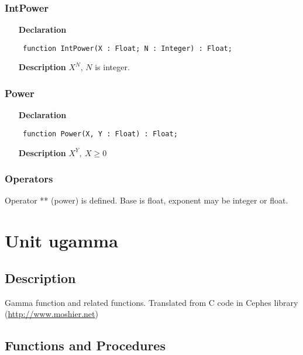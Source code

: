 \documentclass[12pt,a4paper,oneside]{report}
\newcommand{\lmath}[1]{   %
	\marginpar{\vspace{#1} 
		\begin{flushright}
			LMath
	\end{flushright} }
}
\newcommand{\declarationitem}[1]{\textbf{#1}}
\newcommand{\descriptiontitle}[1]{\textbf{#1}}
\newcommand{\code}[1]{\texttt{#1}}
\begin{document}
\subsubsection{IntPower}
\label{umath-IntPower}
\begin{itemize}\item[\declarationitem{Declaration}\hfill]
	\begin{flushleft}
		\code{
			function IntPower(X : Float; N : Integer) : Float;}
		
	\end{flushleft}
	
	\par
	\item[\descriptiontitle{Description}]
	$X^N$, $N$ is integer.
	
\end{itemize}
\subsubsection{Power}
\label{umath-Power}
\begin{itemize}\item[\declarationitem{Declaration}\hfill]
	\begin{flushleft}
		\code{
			function Power(X, Y : Float) : Float;}
		
	\end{flushleft}
	
	\par
	\item[\descriptiontitle{Description}]
	$X^Y,\ X\ge 0$
	
\end{itemize}
\subsubsection{Operators}
Operator ** (power) is defined. Base is float, exponent may be integer or float. \lmath{-12pt}
\section{Unit ugamma}
\label{ugamma}
\subsection{Description}
Gamma function and related functions. Translated from C code in Cephes library (\href{http://www.moshier.net}{http://www.moshier.net}) \subsection{Functions and Procedures}
\end{document}
